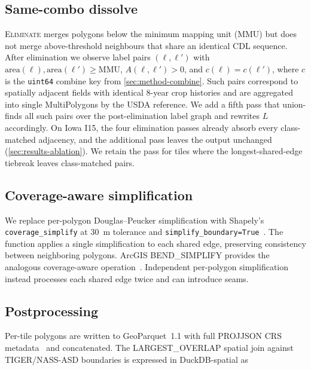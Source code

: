 \documentclass[preprint,12pt]{elsarticle}
\begin{document}
\subsection{Same-combo dissolve}
\label{sec:method-dissolve}

\textsc{Eliminate} merges polygons below the minimum mapping unit (MMU) but
does not merge
above-threshold neighbours that share an identical CDL sequence. After
elimination we observe label pairs $(\ell, \ell')$ with
$\text{area}(\ell), \text{area}(\ell') \geq \text{MMU}$,
$A(\ell, \ell') > 0$, and $c(\ell) = c(\ell')$, where $c$ is the
\texttt{uint64} combine key from \cref{sec:method-combine}. Such pairs
correspond to spatially adjacent fields with identical 8-year crop
histories and are aggregated into single MultiPolygons by the USDA
reference. We add a fifth pass that union-finds all such pairs over
the post-elimination label graph and rewrites $L$ accordingly. On Iowa I15,
the four elimination passes already absorb every class-matched adjacency,
and the additional pass leaves the output unchanged
(\cref{sec:results-ablation}). We retain the pass for tiles where the
longest-shared-edge tiebreak leaves class-matched pairs.

\subsection{Coverage-aware simplification}
\label{sec:method-simplify}

We replace per-polygon Douglas--Peucker simplification with Shapely's
\texttt{coverage\_simplify} at 30~m tolerance and
\texttt{simplify\_boundary=True}~\cite{shapely}. The function applies a
single simplification to each shared edge, preserving consistency between
neighboring polygons. ArcGIS \textsc{BEND\_SIMPLIFY} provides the analogous
coverage-aware operation~\cite{wang1998bend}. Independent per-polygon
simplification instead processes each shared edge twice and can introduce
seams.

\subsection{Postprocessing}
\label{sec:method-postprocess}

Per-tile polygons are written to GeoParquet~1.1 with full PROJJSON CRS
metadata~\cite{geoparquet,kelsey2023geoparquet} and concatenated. The
\textsc{LARGEST\_OVERLAP} spatial join against TIGER/NASS-ASD
boundaries is expressed in DuckDB-spatial as
\end{document}
